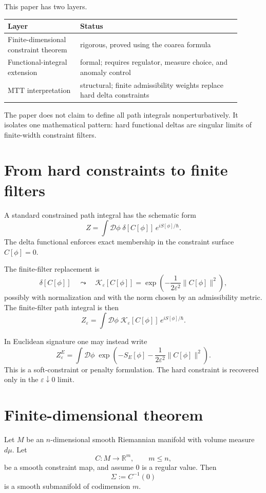 \documentclass[11pt]{article}
\begin{document}
This paper has two layers.

\begin{center}
\begin{tabular}{p{0.28\linewidth}p{0.62\linewidth}}
\toprule
Layer & Status \\
\midrule
Finite-dimensional constraint theorem & rigorous, proved using the coarea formula \\
Functional-integral extension & formal; requires regulator, measure choice, and anomaly control \\
MTT interpretation & structural; finite admissibility weights replace hard delta constraints \\
\bottomrule
\end{tabular}
\end{center}

The paper does not claim to define all path integrals nonperturbatively.  It isolates one
mathematical pattern: hard functional deltas are singular limits of finite-width constraint
filters.

\section{From hard constraints to finite filters}

A standard constrained path integral has the schematic form
\[
Z=\int \mathcal D\phi\; \delta[C[\phi]]\,e^{iS[\phi]/\hbar}.
\]
The delta functional enforces exact membership in the constraint surface \(C[\phi]=0\).

The finite-filter replacement is
\[
\delta[C[\phi]]
\quad\leadsto\quad
\mathcal K_\varepsilon[C[\phi]]
=
\exp\!\left(-\frac{1}{2\varepsilon^2}\|C[\phi]\|^2\right),
\]
possibly with normalization and with the norm chosen by an admissibility metric.
The finite-filter path integral is then
\[
Z_\varepsilon
=
\int \mathcal D\phi\;
\mathcal K_\varepsilon[C[\phi]]\,
e^{iS[\phi]/\hbar}.
\]

In Euclidean signature one may instead write
\[
Z_\varepsilon^{E}
=
\int \mathcal D\phi\;
\exp\!\left(
-S_E[\phi]
-\frac{1}{2\varepsilon^2}\|C[\phi]\|^2
\right).
\]
This is a soft-constraint or penalty formulation.  The hard constraint is recovered only in
the \(\varepsilon\downarrow0\) limit.

\section{Finite-dimensional theorem}

Let \(M\) be an \(n\)-dimensional smooth Riemannian manifold with volume measure \(d\mu\).
Let
\[
C:M\to\mathbb R^m,\qquad m\le n,
\]
be a smooth constraint map, and assume \(0\) is a regular value.  Then
\[
\Sigma:=C^{-1}(0)
\]
is a smooth submanifold of codimension \(m\).
\end{document}
